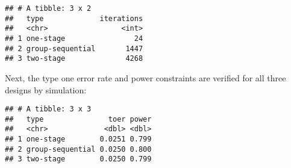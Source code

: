\documentclass[
]{book}
\newenvironment{Shaded}{\begin{snugshade}}{\end{snugshade}}
\newcommand{\DataTypeTok}[1]{\textcolor[rgb]{0.13,0.29,0.53}{#1}}
\newcommand{\DecValTok}[1]{\textcolor[rgb]{0.00,0.00,0.81}{#1}}
\newcommand{\FloatTok}[1]{\textcolor[rgb]{0.00,0.00,0.81}{#1}}
\newcommand{\KeywordTok}[1]{\textcolor[rgb]{0.13,0.29,0.53}{\textbf{#1}}}
\newcommand{\NormalTok}[1]{#1}
\newcommand{\OperatorTok}[1]{\textcolor[rgb]{0.81,0.36,0.00}{\textbf{#1}}}
\newcommand{\StringTok}[1]{\textcolor[rgb]{0.31,0.60,0.02}{#1}}
\begin{document}
\begin{verbatim}
## # A tibble: 3 x 2
##   type             iterations
##   <chr>                 <int>
## 1 one-stage                24
## 2 group-sequential       1447
## 3 two-stage              4268
\end{verbatim}

Next, the type one error rate and power constraints are verified
for all three designs by simulation:

\begin{Shaded}
\end{Shaded}

\begin{verbatim}
## # A tibble: 3 x 3
##   type               toer power
##   <chr>             <dbl> <dbl>
## 1 one-stage        0.0251 0.799
## 2 group-sequential 0.0250 0.800
## 3 two-stage        0.0250 0.799
\end{verbatim}
\end{document}
